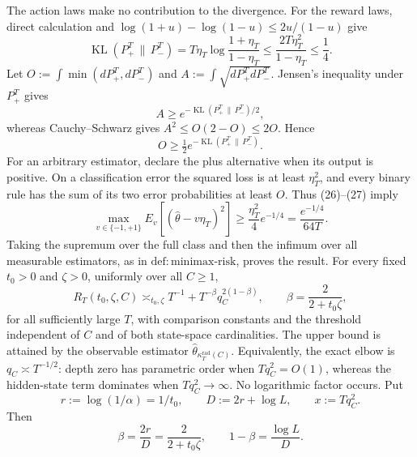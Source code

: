 The action laws make no contribution to the divergence.  For the reward laws, direct calculation and \(\log(1+u)-\log(1-u)\le2u/(1-u)\) give
\[
 \operatorname{KL}(P_+^T\,\|\,P_-^T)
 =T\eta_T\log\frac{1+\eta_T}{1-\eta_T}
 \le\frac{2T\eta_T^2}{1-\eta_T}\le\frac14. \tag{26}
\]
Let \(O:=\int\min(dP_+^T,dP_-^T)\) and \(A:=\int\sqrt{dP_+^TdP_-^T}\).  Jensen's inequality under \(P_+^T\) gives
\[
 A\ge e^{-\operatorname{KL}(P_+^T\,\|\,P_-^T)/2},
\]
whereas Cauchy--Schwarz gives \(A^2\le O(2-O)\le2O\).  Hence
\[
 O\ge\tfrac12e^{-\operatorname{KL}(P_+^T\,\|\,P_-^T)}. \tag{27}
\]
For an arbitrary estimator, declare the plus alternative when its output is positive.  On a classification error the squared loss is at least \(\eta_T^2\), and every binary rule has the sum of its two error probabilities at least \(O\).  Thus (26)--(27) imply
\[
 \max_{v\in\{-1,+1\}}E_v[(\widehat\theta-v\eta_T)^2]
 \ge\frac{\eta_T^2}{4}e^{-1/4}
 =\frac{e^{-1/4}}{64T}.
\]
Taking the supremum over the full class and then the infimum over all measurable estimators, as in \(\mathrm{def{:}minimax\text{-}risk}\), proves the result.
For every fixed \(t_0>0\) and \(\zeta>0\), uniformly over all \(C\ge1\),
\[
 R_T(t_0,\zeta,C)
 \asymp_{t_0,\zeta}
 T^{-1}+T^{-\beta}q_C^{2(1-\beta)},
 \qquad
 \beta=\frac{2}{2+t_0\zeta},
\]
for all sufficiently large \(T\), with comparison constants and the threshold independent of \(C\) and of both state-space cardinalities.  The upper bound is attained by the observable estimator \(\widehat\theta_{\kappa_T^{\mathrm{rad}}(C)}\).  Equivalently, the exact elbow is \(q_C\asymp T^{-1/2}\): depth zero has parametric order when \(Tq_C^2=O(1)\), whereas the hidden-state term dominates when \(Tq_C^2\to\infty\).  No logarithmic factor occurs.
Put
\[
 r:=\log(1/\alpha)=1/t_0,
 \qquad
 D:=2r+\log L,
 \qquad
 x:=Tq_C^2.
\]
Then
\[
 \beta=\frac{2r}{D}=\frac{2}{2+t_0\zeta},
 \qquad
 1-\beta=\frac{\log L}{D}. \tag{28}
\]

